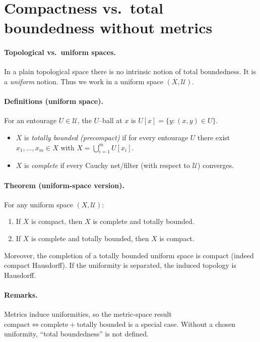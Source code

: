 \documentclass[12pt,a4paper]{article}
\begin{document}
	
\section*{Compactness vs.\ total boundedness without metrics}

\paragraph{Topological vs.\ uniform spaces.}
In a plain topological space there is no intrinsic notion of total boundedness.
It is a \emph{uniform} notion. Thus we work in a uniform space $(X,\mathcal U)$.

\paragraph{Definitions (uniform space).}
For an entourage $U\in\mathcal U$, the $U$–ball at $x$ is $U[x]=\{y:(x,y)\in U\}$.
\begin{itemize}
	\item $X$ is \emph{totally bounded (precompact)} if for every entourage $U$ there exist
	$x_1,\dots,x_m\in X$ with $X=\bigcup_{i=1}^m U[x_i]$.
	\item $X$ is \emph{complete} if every Cauchy net/filter (with respect to $\mathcal U$) converges.
\end{itemize}

\paragraph{Theorem (uniform-space version).}
For any uniform space $(X,\mathcal U)$:
\begin{enumerate}
	\item If $X$ is compact, then $X$ is complete and totally bounded.
	\item If $X$ is complete and totally bounded, then $X$ is compact.
\end{enumerate}
Moreover, the completion of a totally bounded uniform space is compact (indeed compact
Hausdorff). If the uniformity is separated, the induced topology is Hausdorff.

\paragraph{Remarks.}
Metrics induce uniformities, so the metric-space result
$\text{compact} \Leftrightarrow \text{complete}+\text{totally bounded}$
is a special case. Without a chosen uniformity, “total boundedness” is not defined.
\end{document}
